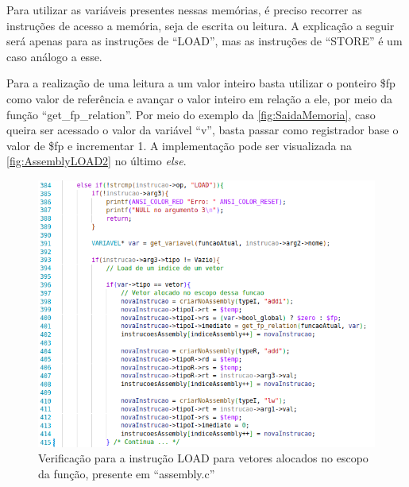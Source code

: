 \documentclass[
	12pt,				%
	oneside,
	a4paper,			%
	english,			%
	french,				%
	spanish,			%
	brazil,				%
	]{abntex2}
\begin{document}
Para utilizar as variáveis presentes nessas memórias, é preciso recorrer as instruções de acesso a memória, seja de escrita ou leitura. A explicação a seguir será apenas para as instruções de ``LOAD'', mas as instruções de ``STORE'' é um caso análogo a esse.

Para a realização de uma leitura a um valor inteiro basta utilizar o ponteiro \$fp como valor de referência e avançar o valor inteiro em relação a ele, por meio da função ``get\_fp\_relation''. Por meio do exemplo da \autoref{fig:SaidaMemoria}, caso queira ser acessado o valor da variável ``v'', basta passar como registrador base o valor de \$fp e incrementar 1. A implementação pode ser visualizada na \autoref{fig:AssemblyLOAD2} no último \emph{else}.

\begin{figure}[htbp]
\centering 
\caption{Verificação para a instrução LOAD para vetores alocados no escopo da função, presente em \nohyphens{``assembly.c''}} 
\label{fig:AssemblyLOAD1}
\graphicspath{ {./imgs/} } 
\includegraphics[scale=0.5]{imgs/Codigo/Assembly_LOAD_Vetor.png}
\end{figure}
\end{document}
